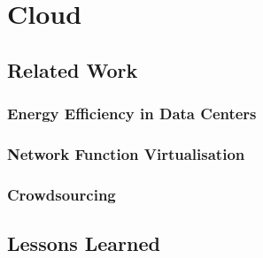 \chapter{Cloud}\label{chap:cloud}

\section{Related Work}
\subsection{Energy Efficiency in Data Centers}
\subsection{Network Function Virtualisation}
\subsection{Crowdsourcing}





\section{Lessons Learned}